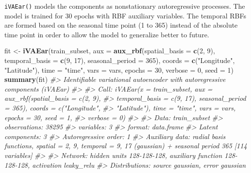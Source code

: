 \documentclass[
]{article}
\newenvironment{Shaded}{\begin{snugshade}}{\end{snugshade}}
\newcommand{\AttributeTok}[1]{\textcolor[rgb]{0.13,0.29,0.53}{#1}}
\newcommand{\CommentTok}[1]{\textcolor[rgb]{0.56,0.35,0.01}{\textit{#1}}}
\newcommand{\DecValTok}[1]{\textcolor[rgb]{0.00,0.00,0.81}{#1}}
\newcommand{\FunctionTok}[1]{\textcolor[rgb]{0.13,0.29,0.53}{\textbf{#1}}}
\newcommand{\NormalTok}[1]{#1}
\newcommand{\OtherTok}[1]{\textcolor[rgb]{0.56,0.35,0.01}{#1}}
\newcommand{\StringTok}[1]{\textcolor[rgb]{0.31,0.60,0.02}{#1}}
\begin{document}
\texttt{iVAEar()} models the components as nonstationary autoregressive
processes. The model is trained for 30 epochs with RBF auxiliary
variables. The temporal RBFs are formed based on the seasonal time point
(1 to 365) instead of the absolute time point in order to allow the
model to generalize better to future.

\begin{Shaded}
\begin{Highlighting}[]
\NormalTok{fit }\OtherTok{\textless{}{-}} \FunctionTok{iVAEar}\NormalTok{(train\_subset, }\AttributeTok{aux =} \FunctionTok{aux\_rbf}\NormalTok{(}\AttributeTok{spatial\_basis =} \FunctionTok{c}\NormalTok{(}\DecValTok{2}\NormalTok{, }\DecValTok{9}\NormalTok{),}
                                   \AttributeTok{temporal\_basis =} \FunctionTok{c}\NormalTok{(}\DecValTok{9}\NormalTok{, }\DecValTok{17}\NormalTok{), }\AttributeTok{seasonal\_period =} \DecValTok{365}\NormalTok{),}
              \AttributeTok{coords =} \FunctionTok{c}\NormalTok{(}\StringTok{"Longitude"}\NormalTok{, }\StringTok{"Latitude"}\NormalTok{), }\AttributeTok{time =} \StringTok{"time"}\NormalTok{, }\AttributeTok{vars =}\NormalTok{ vars,}
              \AttributeTok{epochs =} \DecValTok{30}\NormalTok{, }\AttributeTok{verbose =} \DecValTok{0}\NormalTok{, }\AttributeTok{seed =} \DecValTok{1}\NormalTok{)}
\FunctionTok{summary}\NormalTok{(fit)}
\CommentTok{\#\textgreater{} Identifiable variational autoencoder with autoregressive components (iVAEar)}
\CommentTok{\#\textgreater{} }
\CommentTok{\#\textgreater{} Call: iVAEar(x = train\_subset, aux = aux\_rbf(spatial\_basis = c(2, 9), }
\CommentTok{\#\textgreater{}     temporal\_basis = c(9, 17), seasonal\_period = 365), coords = c("Longitude", }
\CommentTok{\#\textgreater{}     "Latitude"), time = "time", vars = vars, epochs = 30, seed = 1, }
\CommentTok{\#\textgreater{}     verbose = 0)}
\CommentTok{\#\textgreater{} }
\CommentTok{\#\textgreater{} Data: train\_subset }
\CommentTok{\#\textgreater{}   observations: 38295 }
\CommentTok{\#\textgreater{}   variables: 3 }
\CommentTok{\#\textgreater{}   format: data.frame }
\CommentTok{\#\textgreater{} Latent components: 3 }
\CommentTok{\#\textgreater{} Autoregressive order: 1 }
\CommentTok{\#\textgreater{} Auxiliary data: radial basis functions, spatial = 2, 9, temporal = 9, 17 (gaussian) + seasonal period 365 [114 variables]}
\CommentTok{\#\textgreater{} }
\CommentTok{\#\textgreater{} Network: hidden units 128{-}128{-}128, auxiliary function 128{-}128{-}128, activation leaky\_relu}
\CommentTok{\#\textgreater{} Distributions: source gaussian, error gaussian}

\end{Highlighting}
\end{Shaded}
\end{document}
